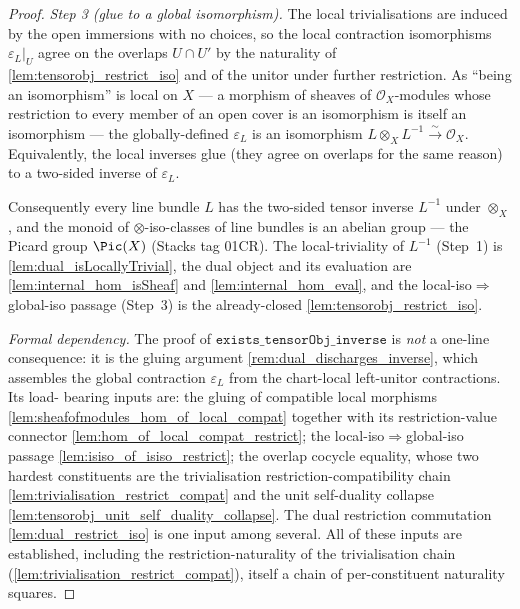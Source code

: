 \begin{proof}
  \emph{Step 3 (glue to a global isomorphism).} The local trivialisations are induced
  by the open immersions with no choices, so the local contraction isomorphisms
  \(\varepsilon_L|_U\) agree on the overlaps \(U \cap U'\) by the naturality of
  \cref{lem:tensorobj_restrict_iso} and of the unitor under further restriction. As
  ``being an isomorphism'' is local on \(X\) --- a morphism of sheaves of
  \(\mathcal{O}_X\)-modules whose restriction to every member of an open cover is an
  isomorphism is itself an isomorphism --- the globally-defined \(\varepsilon_L\) is an
  isomorphism \(L \otimes_X L^{-1} \xrightarrow{\sim} \mathcal{O}_X\). Equivalently, the
  local inverses glue (they agree on overlaps for the same reason) to a two-sided
  inverse of \(\varepsilon_L\).

  Consequently every line bundle \(L\) has the two-sided tensor inverse \(L^{-1}\)
  under \(\otimes_X\), and the monoid of \(\otimes\)-iso-classes of line bundles is
  an abelian group --- the Picard group \(\Pic(X)\) (Stacks tag 01CR). The
  local-triviality of \(L^{-1}\) (Step~1) is \cref{lem:dual_isLocallyTrivial}, the
  dual object and its evaluation are \cref{lem:internal_hom_isSheaf} and
  \cref{lem:internal_hom_eval}, and the local-iso\(\Rightarrow\)global-iso passage
  (Step~3) is the already-closed \cref{lem:tensorobj_restrict_iso}.

  \emph{Formal dependency.} The proof of
  \(\mathtt{exists\_tensorObj\_inverse}\) is \emph{not} a one-line consequence: it is
  the gluing argument \cref{rem:dual_discharges_inverse}, which assembles the global
  contraction \(\varepsilon_L\) from the chart-local left-unitor contractions. Its load-
  bearing inputs are: the gluing of compatible local morphisms
  \cref{lem:sheafofmodules_hom_of_local_compat} together with its restriction-value
  connector \cref{lem:hom_of_local_compat_restrict}; the local-iso\(\Rightarrow\)global-iso
  passage \cref{lem:isiso_of_isiso_restrict}; the overlap cocycle equality, whose two
  hardest constituents are the trivialisation restriction-compatibility chain
  \cref{lem:trivialisation_restrict_compat} and the unit self-duality collapse
  \cref{lem:tensorobj_unit_self_duality_collapse}. The dual restriction commutation
  \cref{lem:dual_restrict_iso} is one input among several. All of these inputs are
  established, including the restriction-naturality of the trivialisation chain
  (\cref{lem:trivialisation_restrict_compat}), itself a chain of per-constituent naturality
  squares.
\end{proof}

